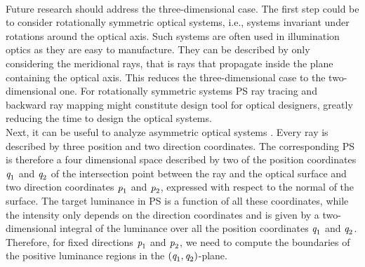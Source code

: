  \\ \indent 
Future research should address the three-dimensional case. The first step could be to consider rotationally symmetric optical systems, i.e., systems invariant under rotations around the optical axis. Such systems are often used in illumination optics as they are easy to manufacture. They can be described by only considering the meridional rays, that is rays that propagate inside the plane containing the optical axis. This reduces the three-dimensional case to the two-dimensional one. 
For rotationally symmetric systems PS ray tracing and backward ray mapping might constitute design tool for optical designers, greatly reducing the time to design the optical systems. 
\\ \indent  Next, it can be useful to analyze asymmetric optical systems \cite{ries1997performance}. Every ray is described by three position and two direction coordinates. The corresponding PS is therefore a four dimensional space described by two of the position coordinates $\textit{q}_1$ and $\textit{q}_2$ of the intersection point between the ray and the optical surface and two direction coordinates $\textit{p}_1$ and $\textit{p}_2$, expressed with respect to the normal of the surface. 
The target luminance in PS is a function of all these coordinates, while the intensity only depends on the direction coordinates and is given by a two-dimensional integral of the luminance over all the position coordinates $\textit{q}_1$ and $\textit{q}_2$. 
Therefore, for fixed directions $\textit{p}_1$ and $\textit{p}_2$, we need to compute the boundaries of the positive luminance regions in the $(\textit{q}_1, \textit{q}_2)$-plane. 

